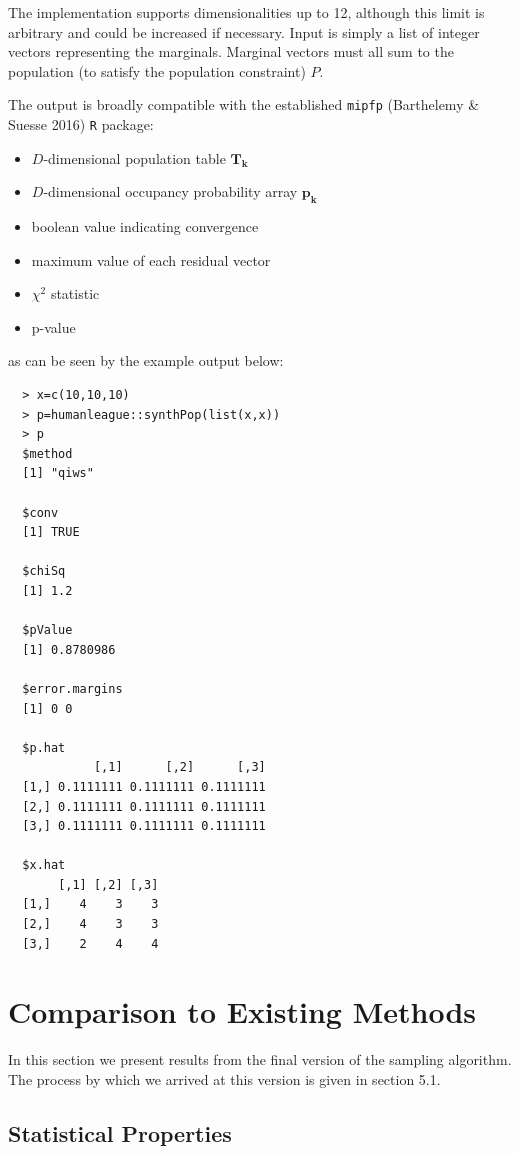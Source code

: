 \documentclass[]{article}
\providecommand{\tightlist}{%
  \setlength{\itemsep}{0pt}\setlength{\parskip}{0pt}}
\begin{document}
The implementation supports dimensionalities up to 12, although this
limit is arbitrary and could be increased if necessary. Input is simply
a list of integer vectors representing the marginals. Marginal vectors
must all sum to the population (to satisfy the population constraint) \(P\).

The output is broadly compatible with the established \texttt{mipfp}
(Barthelemy \& Suesse 2016) \texttt{R} package:

\begin{itemize}
\tightlist
\item
  \(D\)-dimensional population table \(\mathbf{T_\mathbf{k}}\)
\item
  \(D\)-dimensional occupancy probability array
  \(\mathbf{p_\mathbf{k}}\)
\item
  boolean value indicating convergence
\item
  maximum value of each residual vector
\item
  \(\chi^2\) statistic
\item
  p-value
\end{itemize}

as can be seen by the example output below:

\begin{verbatim}
  > x=c(10,10,10)
  > p=humanleague::synthPop(list(x,x))
  > p
  $method
  [1] "qiws"
  
  $conv
  [1] TRUE
  
  $chiSq
  [1] 1.2
  
  $pValue
  [1] 0.8780986
  
  $error.margins
  [1] 0 0
  
  $p.hat
            [,1]      [,2]      [,3]
  [1,] 0.1111111 0.1111111 0.1111111
  [2,] 0.1111111 0.1111111 0.1111111
  [3,] 0.1111111 0.1111111 0.1111111
  
  $x.hat
       [,1] [,2] [,3]
  [1,]    4    3    3
  [2,]    4    3    3
  [3,]    2    4    4
\end{verbatim}

\section{Comparison to Existing
Methods}\label{comparison-to-existing-methods}

In this section we present results from the final version of the
sampling algorithm. The process by which we arrived at this version is
given in section 5.1.

\subsection{Statistical Properties}\label{statistical-properties}
\end{document}
